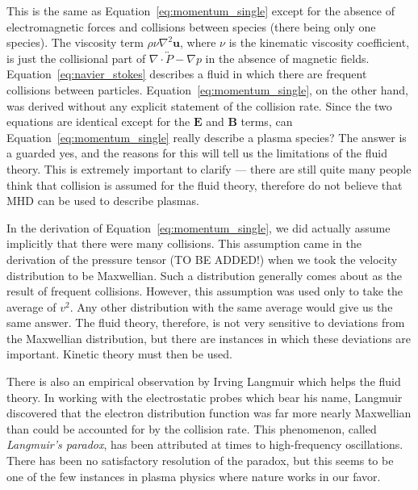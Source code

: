 \documentclass[
  notoc %
]{tufte-book}
\begin{document}
This is the same as Equation~\ref{eq:momentum_single} except for the
absence of electromagnetic forces and collisions between species (there
being only one species). The viscosity term
\(\rho\nu\nabla^2\mathbf{u}\), where \(\nu\) is the kinematic viscosity
coefficient, is just the collisional part of
\(\nabla\cdot\overleftrightarrow{P} - \nabla p\) in the absence of
magnetic fields. Equation~\ref{eq:navier_stokes} describes a fluid in
which there are frequent collisions between particles.
Equation~\ref{eq:momentum_single}, on the other hand, was derived
without any explicit statement of the collision rate. Since the two
equations are identical except for the \(\mathbf{E}\) and \(\mathbf{B}\)
terms, can Equation~\ref{eq:momentum_single} really describe a plasma
species? The answer is a guarded yes, and the reasons for this will tell
us the limitations of the fluid theory. This is extremely important to
clarify --- there are still quite many people think that collision is
assumed for the fluid theory, therefore do not believe that MHD can be
used to describe plasmas.

In the derivation of Equation~\ref{eq:momentum_single}, we did actually
assume implicitly that there were many collisions. This assumption came
in the derivation of the pressure tensor (TO BE ADDED!) when we took the
velocity distribution to be Maxwellian. Such a distribution generally
comes about as the result of frequent collisions. However, this
assumption was used only to take the average of \(v^2\). Any other
distribution with the same average would give us the same answer. The
fluid theory, therefore, is not very sensitive to deviations from the
Maxwellian distribution, but there are instances in which these
deviations are important. Kinetic theory must then be used.

There is also an empirical observation by Irving Langmuir which helps
the fluid theory. In working with the electrostatic probes which bear
his name, Langmuir discovered that the electron distribution function
was far more nearly Maxwellian than could be accounted for by the
collision rate. This phenomenon, called \emph{Langmuir's paradox}, has
been attributed at times to high-frequency oscillations. There has been
no satisfactory resolution of the paradox, but this seems to be one of
the few instances in plasma physics where nature works in our favor.
\end{document}
